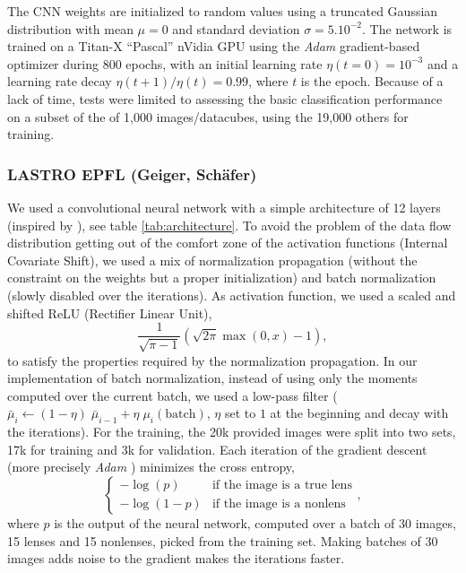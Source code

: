 \documentclass[useAMS,usenatbib]{mnras}
\begin{document}
The CNN weights are initialized to random values using a truncated Gaussian distribution with mean $\mu=0$ and standard deviation $\sigma=5.10^{-2}$. The network is trained on a Titan-X ``Pascal'' nVidia GPU using the \textit{Adam} gradient-based optimizer \citep{2014arXiv1412.6980K} during 800 epochs, with an initial learning rate $\eta(t=0)=10^{-3}$ and a learning rate decay $\eta(t+1)/\eta(t)=0.99$, where $t$ is the epoch. Because of a lack of time, tests were limited to assessing the basic classification performance on a subset of the of 1,000 images/datacubes, using the 19,000 others for training.



\subsubsection{LASTRO EPFL (Geiger, Sch\"{a}fer)}

We used a convolutional neural network \citep{Fukushima1980,Lecun1998} with a simple architecture of 12 layers (inspired by \citep{symmetry}), see table \ref{tab:architecture}.
To avoid the problem of the data flow distribution getting out of the comfort zone of the activation functions (Internal Covariate Shift), we used a mix of normalization propagation \citep{norm_prop} (without the constraint on the weights but a proper initialization) and batch normalization \citep{batch_norm} (slowly disabled over the iterations).
As activation function, we used a scaled and shifted ReLU (Rectifier Linear Unit), 
\begin{equation} \label{eq:relu}
    \frac{1}{\sqrt{\pi-1}} (\sqrt{2 \pi} \max(0,x) - 1),
\end{equation}
to satisfy the properties required by the normalization propagation.
In our implementation of batch normalization, instead of using only the moments computed over the current batch, we used a low-pass filter ($\bar\mu_i \longleftarrow (1-\eta) \; \bar\mu_{i-1} + \eta \; \mu_i(\text{batch})$, $\eta$ set to $1$ at the beginning and decay with the iterations).
For the training, the 20k provided images were split into two sets, 17k for training and 3k for validation.
Each iteration of the gradient descent (more precisely \textit{Adam} \citep{adam}) minimizes the cross entropy, 
\begin{equation} \label{eq:xent}
    \left\{
    \begin{array}{ll}
        - \log(p)   & \text{if the image is a true lens} \\
        - \log(1-p) & \text{if the image is a nonlens}
    \end{array}
    \right.,
\end{equation}
where $p$ is the output of the neural network, computed over a batch of 30 images, 15 lenses and 15 nonlenses, picked from the training set.
Making batches of 30 images adds noise to the gradient makes the iterations faster.
\end{document}
